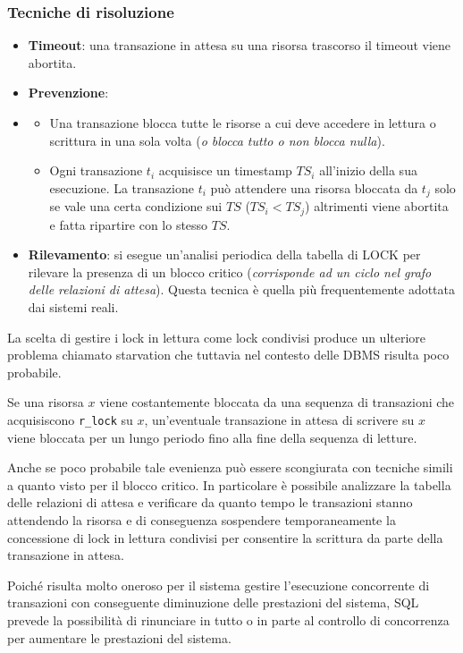\documentclass[oneside,a4paper,11pt]{book}
\theoremstyle{italicstyle}
\theoremstyle{normStyle}
\begin{document}
\subsubsection{Tecniche di risoluzione}
\begin{itemize}
  \item \textbf{Timeout}: una transazione in attesa su una risorsa trascorso il timeout viene abortita.
  \item \textbf{Prevenzione}: 
  \item \begin{itemize}
    \item Una transazione blocca tutte le risorse a cui deve accedere in lettura 
    o scrittura in una sola volta (\textit{o blocca tutto o non blocca nulla}).
    \item Ogni transazione $t_i$ acquisisce un timestamp $TS_i$ all'inizio della sua esecuzione.
    La transazione $t_i$ può attendere una risorsa bloccata da $t_j$ solo se vale una certa 
    condizione sui $TS$ ($TS_i < TS_j$) altrimenti viene abortita e fatta ripartire con lo stesso $TS$.
  \end{itemize}
  \item \textbf{Rilevamento}: si esegue un'analisi periodica della tabella di LOCK per rilevare la 
  presenza di un blocco critico (\textit{corrisponde ad un ciclo nel grafo 
  delle relazioni di attesa}). Questa tecnica è quella più frequentemente adottata dai sistemi 
  reali.
\end{itemize}
La scelta di gestire i lock in lettura come lock condivisi produce un ulteriore problema chiamato starvation 
che tuttavia nel contesto delle DBMS risulta poco probabile.

Se una risorsa $x$ viene costantemente bloccata da una sequenza di transazioni che acquisiscono 
\verb|r_lock| su $x$, un'eventuale transazione in attesa di scrivere su $x$ viene 
bloccata per un lungo periodo fino alla fine della sequenza di letture.

Anche se poco probabile tale evenienza può essere scongiurata con tecniche 
simili a quanto visto per il blocco critico. In particolare è possibile 
analizzare la tabella delle relazioni di attesa e verificare da quanto tempo 
le transazioni stanno attendendo la risorsa e di conseguenza sospendere 
temporaneamente la concessione di lock in lettura condivisi per consentire la scrittura da parte 
della transazione in attesa.

Poiché risulta molto oneroso per il sistema gestire l'esecuzione concorrente di 
transazioni con conseguente diminuzione delle prestazioni del sistema, SQL 
prevede la possibilità di rinunciare in tutto o in parte al controllo di concorrenza per aumentare le prestazioni 
del sistema.
\end{document}
